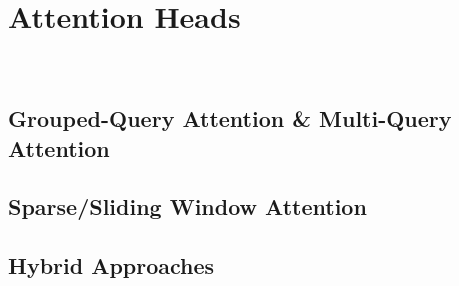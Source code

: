 \clearpage
{\chaptoc\noindent\begin{minipage}[inner sep=0,outer sep=0]{0.9\linewidth}\section{Attention Heads}\end{minipage}}
\\

\subsection{Grouped-Query Attention \& Multi-Query Attention}

\subsection{Sparse/Sliding Window Attention}

\subsection{Hybrid Approaches}




